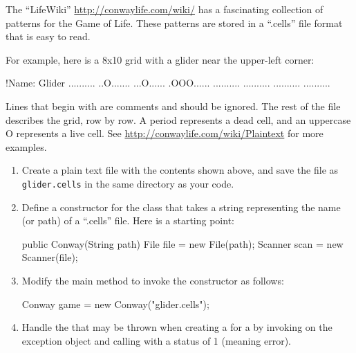 

\begin{exercise}
The ``LifeWiki'' \url{http://conwaylife.com/wiki/} has a fascinating collection of patterns for the Game of Life.
These patterns are stored in a ``.cells'' file format that is easy to read.

For example, here is a 8x10 grid with a glider near the upper-left corner:
\begin{stdout}
!Name: Glider
..........
..O.......
...O......
.OOO......
..........
..........
..........
..........
\end{stdout}

Lines that begin with \java{!} are comments and should be ignored.
The rest of the file describes the grid, row by row.
A period represents a dead cell, and an uppercase O represents a live cell.
See \url{http://conwaylife.com/wiki/Plaintext} for more examples.

\begin{enumerate}

\item Create a plain text file with the contents shown above, and save the file as \verb|glider.cells| in the same directory as your code.

\item Define a constructor for the  class that takes a string representing the name (or path) of a ``.cells'' file.
Here is a starting point:

\begin{code}
public Conway(String path) {
    File file = new File(path);
    Scanner scan = new Scanner(file);
}
\end{code}

\item Modify the main method to invoke the constructor as follows:

\begin{code}
Conway game = new Conway("glider.cells");
\end{code}

\item Handle the  that may be thrown when creating a  for a  by invoking  on the exception object and calling  with a status of 1 (meaning error).


\end{enumerate}
\end{exercise}
